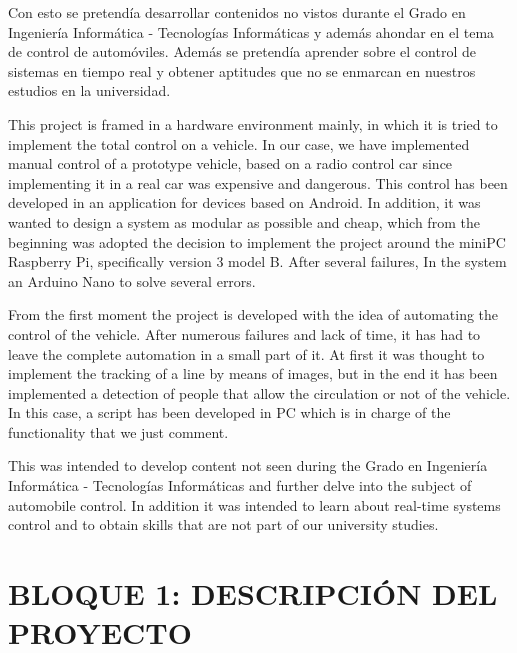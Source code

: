 \documentclass{pclass}
\begin{document}
\medspace
\medspace
\medspace

Con esto se pretendía desarrollar contenidos no vistos durante el Grado en Ingeniería Informática - Tecnologías Informáticas y además ahondar en el tema de control de automóviles. Además se pretendía aprender sobre el control de sistemas en tiempo real y obtener aptitudes que no se enmarcan en nuestros estudios en la universidad.




This project is framed in a hardware environment mainly, in which it is tried to implement the total control on a vehicle. In our case, we have implemented manual control of a prototype vehicle, based on a radio control car since implementing it in a real car was expensive and dangerous. This control has been developed in an application for devices based on Android. In addition, it was wanted to design a system as modular as possible and cheap, which from the beginning was adopted the decision to implement the project around the miniPC Raspberry Pi, specifically version 3 model B. After several failures, In the system an Arduino Nano to solve several errors.

\medspace
\medspace
\medspace

From the first moment the project is developed with the idea of automating the control of the vehicle. After numerous failures and lack of time, it has had to leave the complete automation in a small part of it. At first it was thought to implement the tracking of a line by means of images, but in the end it has been implemented a detection of people that allow the circulation or not of the vehicle. In this case, a script has been developed in PC which is in charge of the functionality that we just comment.

\medspace
\medspace
\medspace

This was intended to develop content not seen during the Grado en Ingeniería Informática - Tecnologías Informáticas and further delve into the subject of automobile control. In addition it was intended to learn about real-time systems control and to obtain skills that are not part of our university studies.
        
\tableofcontents


\listoffigures
\mainmatter  


\chapter{BLOQUE 1: DESCRIPCIÓN DEL PROYECTO}
\end{document}
